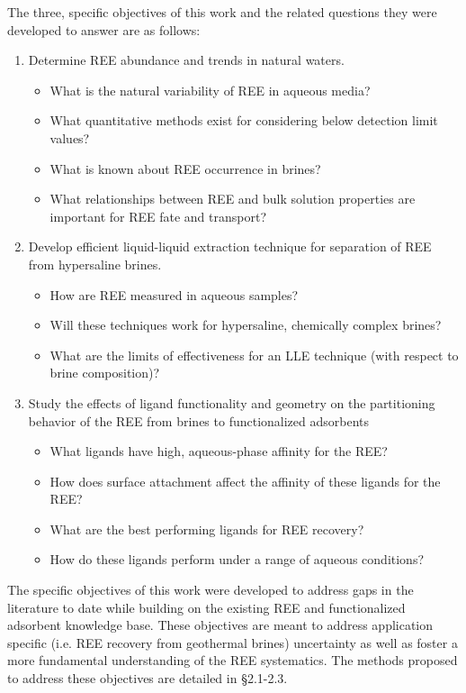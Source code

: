The three, specific objectives of this work and the related questions they were developed to answer are as follows:
\begin{enumerate}
	\item Determine REE abundance and trends in natural waters.
	\begin{itemize}
		\item	What is the natural variability of REE in aqueous media?
		\item	What quantitative methods exist for considering below detection limit values?
		\item	What is known about REE occurrence in brines?
		\item	What relationships between REE and bulk solution properties are important for REE fate and transport?
	\end{itemize}
	\item Develop efficient liquid-liquid extraction technique for separation of REE from hypersaline brines.
	\begin{itemize}
		\item	How are REE measured in aqueous samples?
		\item Will these techniques work for hypersaline, chemically complex brines?
		\item What are the limits of effectiveness for an LLE technique (with respect to brine composition)?
	\end{itemize}
	\item	Study the effects of ligand functionality and geometry on the partitioning behavior of the REE from brines to functionalized adsorbents
	\begin{itemize}
		\item	What ligands have high, aqueous-phase affinity for the REE?
		\item How does surface attachment affect the affinity of these ligands for the REE?
		\item What are the best performing ligands for REE recovery?
		\item How do these ligands perform under a range of aqueous conditions? 
	\end{itemize}
\end{enumerate}

The specific objectives of this work were developed to address gaps in the literature to date while building on the existing REE and functionalized adsorbent knowledge base. These objectives are meant to address application specific (i.e. REE recovery from geothermal brines) uncertainty as well as foster a more fundamental understanding of the REE systematics. The methods proposed to address these objectives are detailed in \S2.1-2.3.
